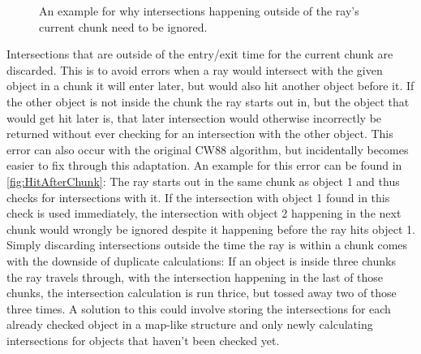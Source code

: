 \begin{figure}[t!]
    
    \caption{An example for why intersections happening outside of the ray's current chunk need to be ignored.}\label{fig:HitAfterChunk}
\end{figure}
Intersections that are outside of the entry/exit time for the current chunk are discarded.
This is to avoid errors when a ray would intersect with the given object in a chunk it will enter later,
but would also hit another object before it.
If the other object is not inside the chunk the ray starts out in,
but the object that would get hit later is,
that later intersection would otherwise incorrectly be returned without ever checking for an intersection with the other object.
This error can also occur with the original CW88 algorithm,
but incidentally becomes easier to fix through this adaptation.
\newline
An example for this error can be found in \autoref{fig:HitAfterChunk}:
The ray starts out in the same chunk as object 1 and thus checks for intersections with it.
If the intersection with object 1 found in this check is used immediately,
the intersection with object 2 happening in the next chunk would wrongly be ignored despite it happening before the ray hits object 1.
\newline
Simply discarding intersections outside the time the ray is within a chunk comes with the downside of duplicate calculations:
If an object is inside three chunks the ray travels through, with the intersection happening in the last of those chunks,
the intersection calculation is run thrice, but tossed away two of those three times.
\newline
A solution to this could involve storing the intersections for each already checked object in a map-like structure
and only newly calculating intersections for objects that haven't been checked yet.

